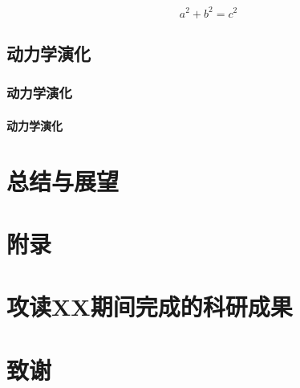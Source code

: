 \documentclass{YNUthesis}
\begin{document}
\zhlipsum

\[
    a^2+b^2=c^2
\]

\zhlipsum

\section{动力学演化}
\zhlipsum

\subsection{动力学演化}
\zhlipsum

\subsubsection{动力学演化}
\zhlipsum

\chapter{总结与展望}
\zhlipsum

\appendix
\chapter{附录}
\zhlipsum

\backmatter

\printbibliography

\chapter{攻读XX期间完成的科研成果}
\zhlipsum

\chapter{致谢}
\zhlipsum
\end{document}
